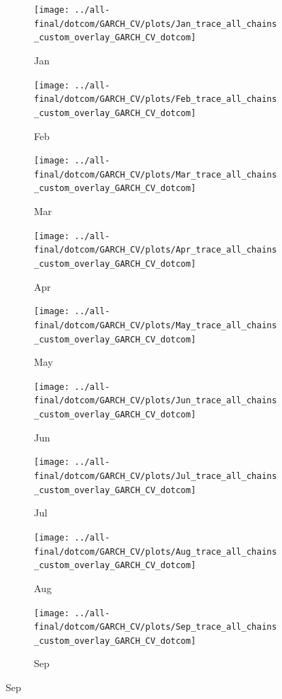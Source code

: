 \documentclass[ngerman]{ttlab-qualify}
\begin{document}
\begin{figure}[H]
\centering
  \begin{subfigure}{.3\linewidth}
  \texttt{[image: ../all-final/dotcom/GARCH\_CV/plots/Jan\_trace\_all\_chains\_custom\_overlay\_GARCH\_CV\_dotcom]}\hfill
  \caption{Jan}
  \end{subfigure}
  \begin{subfigure}{.3\linewidth}
  \texttt{[image: ../all-final/dotcom/GARCH\_CV/plots/Feb\_trace\_all\_chains\_custom\_overlay\_GARCH\_CV\_dotcom]}\hfill
  \caption{Feb}
  \end{subfigure}
  \begin{subfigure}{.3\linewidth}
  \texttt{[image: ../all-final/dotcom/GARCH\_CV/plots/Mar\_trace\_all\_chains\_custom\_overlay\_GARCH\_CV\_dotcom]}\hfill
  \caption{Mar}
  \end{subfigure}\par\medskip
  \begin{subfigure}{.3\linewidth}
  \texttt{[image: ../all-final/dotcom/GARCH\_CV/plots/Apr\_trace\_all\_chains\_custom\_overlay\_GARCH\_CV\_dotcom]}\hfill
  \caption{Apr}
  \end{subfigure}
  \begin{subfigure}{.3\linewidth}
  \texttt{[image: ../all-final/dotcom/GARCH\_CV/plots/May\_trace\_all\_chains\_custom\_overlay\_GARCH\_CV\_dotcom]}\hfill
  \caption{May}
  \end{subfigure}
  \begin{subfigure}{.3\linewidth}
  \texttt{[image: ../all-final/dotcom/GARCH\_CV/plots/Jun\_trace\_all\_chains\_custom\_overlay\_GARCH\_CV\_dotcom]}\hfill
  \caption{Jun}
  \end{subfigure}\par\medskip
  \begin{subfigure}{.3\linewidth}
  \texttt{[image: ../all-final/dotcom/GARCH\_CV/plots/Jul\_trace\_all\_chains\_custom\_overlay\_GARCH\_CV\_dotcom]}\hfill
  \caption{Jul}
  \end{subfigure}
  \begin{subfigure}{.3\linewidth}
  \texttt{[image: ../all-final/dotcom/GARCH\_CV/plots/Aug\_trace\_all\_chains\_custom\_overlay\_GARCH\_CV\_dotcom]}\hfill
  \caption{Aug}
  \end{subfigure}
  \begin{subfigure}{.3\linewidth}
  \texttt{[image: ../all-final/dotcom/GARCH\_CV/plots/Sep\_trace\_all\_chains\_custom\_overlay\_GARCH\_CV\_dotcom]}\hfill
  \caption{Sep}
  \end{subfigure}\par\medskip

\end{figure}
\end{document}
